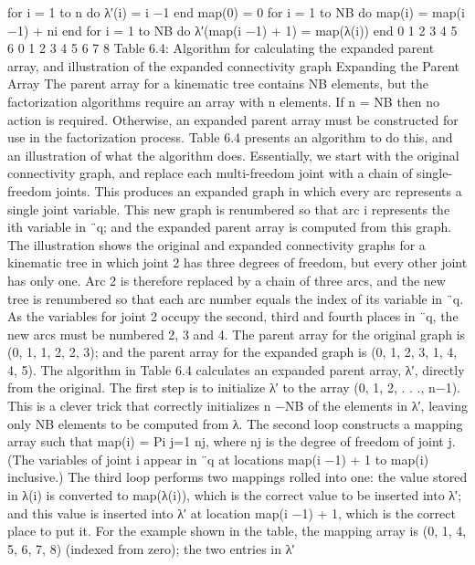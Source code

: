 for i = 1 to n do λ′(i) = i −1 end map(0) = 0 for i = 1 to NB do map(i) = map(i −1) + ni end for i = 1 to NB do λ′(map(i −1) + 1) = map(λ(i)) end 0 1 2 3 4 5 6 0 1 2 3 4 5 6 7 8 Table 6.4: Algorithm for calculating the expanded parent array, and illustration of the expanded connectivity graph Expanding the Parent Array The parent array for a kinematic tree contains NB elements, but the factorization algorithms require an array with n elements. If n = NB then no action is required. Otherwise, an expanded parent array must be constructed for use in the factorization process. Table 6.4 presents an algorithm to do this, and an illustration of what the algorithm does. Essentially, we start with the original connectivity graph, and replace each multi-freedom joint with a chain of single-freedom joints. This produces an expanded graph in which every arc represents a single joint variable. This new graph is renumbered so that arc i represents the ith variable in ¨q; and the expanded parent array is computed from this graph. The illustration shows the original and expanded connectivity graphs for a kinematic tree in which joint 2 has three degrees of freedom, but every other joint has only one. Arc 2 is therefore replaced by a chain of three arcs, and the new tree is renumbered so that each arc number equals the index of its variable in ¨q. As the variables for joint 2 occupy the second, third and fourth places in ¨q, the new arcs must be numbered 2, 3 and 4. The parent array for the original graph is (0, 1, 1, 2, 2, 3); and the parent array for the expanded graph is (0, 1, 2, 3, 1, 4, 4, 5). The algorithm in Table 6.4 calculates an expanded parent array, λ′, directly from the original. The first step is to initialize λ′ to the array (0, 1, 2, . . ., n−1). This is a clever trick that correctly initializes n −NB of the elements in λ′, leaving only NB elements to be computed from λ. The second loop constructs a mapping array such that map(i) = Pi j=1 nj, where nj is the degree of freedom of joint j. (The variables of joint i appear in ¨q at locations map(i −1) + 1 to map(i) inclusive.) The third loop performs two mappings rolled into one: the value stored in λ(i) is converted to map(λ(i)), which is the correct value to be inserted into λ′; and this value is inserted into λ′ at location map(i −1) + 1, which is the correct place to put it. For the example shown in the table, the mapping array is (0, 1, 4, 5, 6, 7, 8) (indexed from zero); the two entries in λ′

